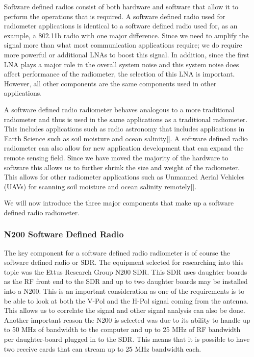 Software defined radios consist of both hardware and software that allow it to perform the operations that is required.  A software defined radio used for radiometer applications is identical to a software defined radio used for, as an example, a 802.11b radio with one major difference.  Since we need to amplify the signal more than what most communication applications require; we do require more powerful or additional LNAs to boost this signal.  In addition, since the first LNA plays a major role in the overall system noise and this system noise does affect performance of the radiometer, the selection of this LNA is important.  However, all other components are the same components used in other applications.

A software defined radio radiometer behaves analogous to a more traditional radiometer and thus is used in the same applications as a traditional radiometer.  This includes applications such as radio astronomy that includes applications in Earth Science such as soil moisture and ocean salinity[\cite{Ruf}].  A software defined radio radiometer can also allow for new application development that can expand the remote sensing field.  Since we have moved the majority of the hardware to software this allows us to further shrink the size and weight of the radiometer.  This allows for other radiometer applications such as Unmanned Aerial Vehicles (UAVs) for scanning soil moisture and ocean salinity remotely[\cite{McIntyre}].  

We will now introduce the three major components that make up a software defined radio radiometer.  

\subsubsection{N200 Software Defined Radio} 
The key component for a software defined radio radiometer is of course the software defined radio or SDR.  The equipment selected for researching into this topic was the Ettus Research Group N200 SDR.  This SDR uses daughter boards as the RF front end to the SDR and up to two daughter boards may be installed into a N200.  This is an important consideration as one of the requirements is to be able to look at both the V-Pol and the H-Pol signal coming from the antenna.  This allows us to correlate the signal and other signal analysis can also be done.  Another important reason the N200 is selected was due to its ability to handle up to 50 MHz of bandwidth to the computer and up to 25 MHz of RF bandwidth per daughter-board plugged in to the SDR.  This means that it is possible to have two receive cards that can stream up to 25 MHz bandwidth each.  

